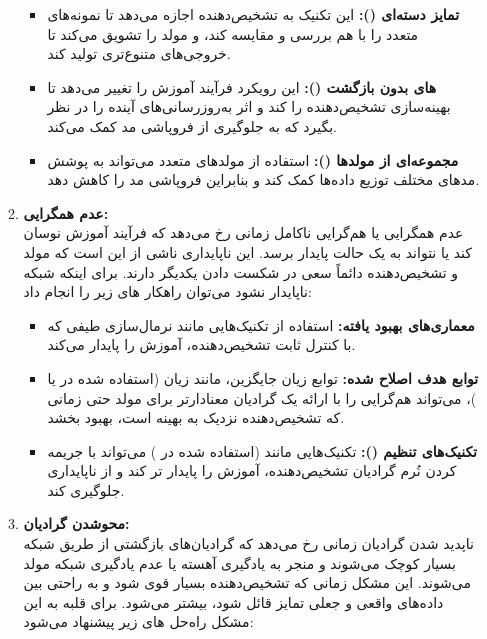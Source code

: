 \begin{enumerate}
\begin{qsolve}
\begin{enumerate}
			\begin{itemize}
				\item \textbf{تمایز دسته‌ای (): }این تکنیک به تشخیص‌دهنده اجازه می‌دهد تا نمونه‌های متعدد را با هم بررسی و مقایسه کند، و مولد را تشویق می‌کند تا خروجی‌های متنوع‌تری تولید کند.
				
				\item \textbf{ های بدون بازگشت (): }این رویکرد فرآیند آموزش را تغییر می‌دهد تا بهینه‌سازی تشخیص‌دهنده را  کند و اثر به‌روزرسانی‌های آینده را در نظر بگیرد که به جلوگیری از فروپاشی مد کمک می‌کند.
				
				\item \textbf{مجموعه‌ای از مولدها (): }استفاده از مولدهای متعدد می‌تواند به پوشش مدهای مختلف توزیع داده‌ها کمک کند و بنابراین فروپاشی مد را کاهش دهد.
			\end{itemize}
			
			
			
			\item \textbf{عدم همگرایی:}\\
عدم همگرایی یا هم‌گرایی ناکامل زمانی رخ می‌دهد که فرآیند آموزش  نوسان کند یا نتواند به یک حالت پایدار برسد. این ناپایداری ناشی از این است که مولد و تشخیص‌دهنده دائماً سعی در شکست دادن یکدیگر دارند. برای اینکه شبکه ناپایدار نشود می‌توان راهکار های زیر را انجام داد:

			\begin{itemize}
				\item \textbf{معماری‌های بهبود یافته: }استفاده از تکنیک‌هایی مانند نرمال‌سازی طیفی که با کنترل ثابت  تشخیص‌دهنده، آموزش را پایدار می‌کند.
				
				\item \textbf{توابع هدف اصلاح شده: }توابع زیان جایگزین، مانند زیان  (استفاده شده در  یا )، می‌تواند هم‌گرایی را با ارائه یک گرادیان معنادارتر برای مولد حتی زمانی که تشخیص‌دهنده نزدیک به بهینه است، بهبود بخشد.
				
				\item \textbf{تکنیک‌های تنظیم (): }تکنیک‌هایی مانند  (استفاده شده در ) می‌تواند با جریمه کردن نُرم گرادیان تشخیص‌دهنده، آموزش را پایدار تر کند و از ناپایداری جلوگیری کند.
			\end{itemize}
			
			
			
			
			\item \textbf{محوشدن گرادیان:}\\
ناپدید شدن گرادیان‌ زمانی رخ می‌دهد که گرادیان‌های بازگشتی از طریق شبکه بسیار کوچک می‌شوند و منجر به یادگیری آهسته یا عدم یادگیری شبکه مولد می‌شوند. این مشکل زمانی که تشخیص‌دهنده بسیار قوی شود و به راحتی بین داده‌های واقعی و جعلی تمایز قائل شود، بیشتر می‌شود. برای قلبه به این مشکل راه‌حل های زیر پیشنهاد می‌شود:
		\end{enumerate}
	\end{qsolve}
	

\end{enumerate}
